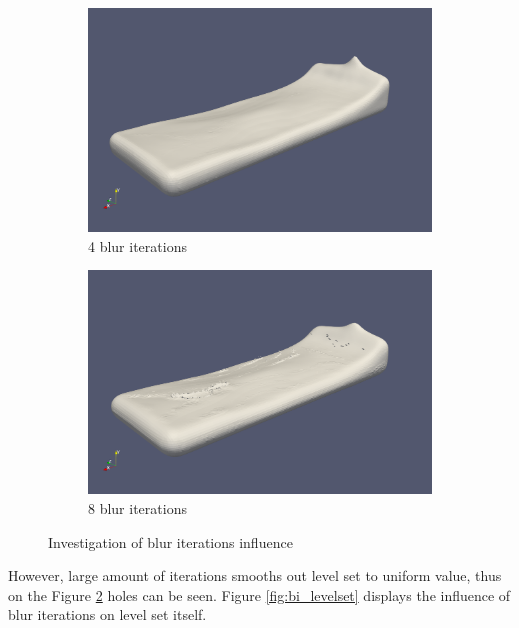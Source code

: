 \begin{figure}[H]

        \begin{subfigure}[b]{\textwidth}
               \includegraphics[width=\textwidth]{figures/ReconstructionIterations4.png}
				\caption{4 blur iterations}
               \label{fig:bi_4iteration}
        \end{subfigure}
        \begin{subfigure}[b]{\textwidth}
               \includegraphics[width=\textwidth]{figures/ReconstructionIterations8.png}
				\caption{8 blur iterations}
               \label{fig:bi_8iteration}
        \end{subfigure}
       \caption{Investigation of blur iterations influence}
       \label{fig:bi_reconstruction2}
\end{figure}
However, large amount of iterations smooths out level set to uniform value, thus on the Figure \ref{fig:bi_8iteration} holes can be seen. Figure \ref{fig:bi_levelset} displays the influence of blur iterations on level set itself. 
